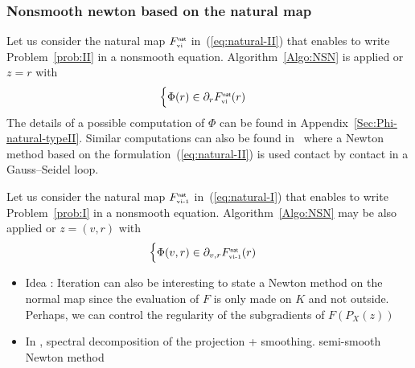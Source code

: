 \subsubsection{Nonsmooth newton based on the natural map }
Let us consider the natural map $F_{{\hbox{\tiny{vi}}}}^{\hbox{\sf \tiny{nat}}}$ in~(\ref{eq:natural-II}) that enables to write Problem~\ref{prob:II} in a nonsmooth equation. Algorithm~\ref{Algo:NSN} is applied or $z =r$ with
\begin{equation}
  \label{eq:phiphi}
  \begin{cases}
    \Phi(r) \in \partial_{r} F_{\vitwo}^\nat(r)
  \end{cases}
\end{equation}
 The details of a possible computation of $\Phi$ can be found in Appendix~\ref{Sec:Phi-natural-typeII}.  Similar computations can also be found in~\cite{Joli.Feng2008} where a Newton method based on the formulation~(\ref{eq:natural-II}) is used contact by contact in a Gauss--Seidel loop.

Let us consider the natural map $F_{{\hbox{\tiny{vi-1}}}}^{\hbox{\sf \tiny{nat}}}$ in~(\ref{eq:natural-I}) that enables to write Problem~\ref{prob:I} in a nonsmooth equation.  Algorithm~\ref{Algo:NSN} may be also applied or $z =(v,r)$ with
\begin{equation}
  \label{eq:phiphi}
  \begin{cases}
    \Phi(v,r) \in \partial_{v,r} F_{\vione}^\nat(r)
  \end{cases}
\end{equation}

\begin{ndrva}
  \begin{itemize}
    \item  Idea : Iteration can also be interesting to state a Newton method
    on the normal map since the evaluation of $F$ is only made on $K$
    and not outside. Perhaps, we can control the regularity of the
    subgradients of $F(P_X(z))$
    \item In \cite{Hayashi.ea_SIOPT2005}, spectral decomposition of the projection + smoothing.  semi-smooth Newton method
  \end{itemize}
\end{ndrva}

